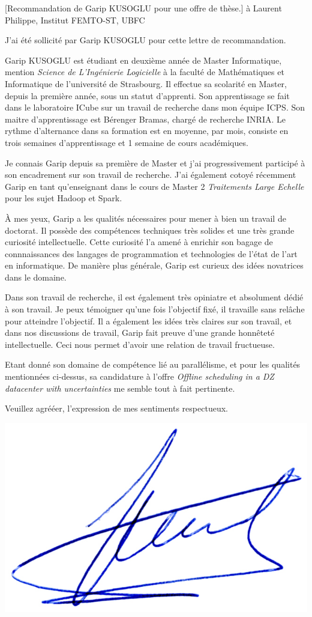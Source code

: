 \documentclass[a4paper,10pt]{article}
\begin{document}

\begin{letter}[Recommandation de Garip \textsc{KUSOGLU} pour une offre de thèse.]%
  {à}%
  {Laurent Philippe, Institut FEMTO-ST, UBFC}


\noindent  J'ai été sollicité par Garip KUSOGLU pour cette lettre de recommandation.

  Garip KUSOGLU est  étudiant en deuxième année de  Master Informatique, mention
  \textit{Science de L'Ingénierie  Logicielle} à la faculté  de Mathématiques et
  Informatique  de l'université  de  Strasbourg.  Il  effectue  sa scolarité  en
  Master, depuis la première année, sous un statut d'apprenti. Son apprentissage
  se fait dans le laboratoire ICube sur  un travail de recherche dans mon équipe
  ICPS.  Son maitre  d'apprentissage est  Bérenger Bramas,  chargé de  recherche
  INRIA. Le  rythme d'alternance  dans sa  formation est  en moyenne,  par mois,
  consiste en trois semaines d'apprentissage et 1 semaine de cours académiques.
  
  Je  connais  Garip  depuis  sa  première de  Master  et  j'ai  progressivement
  participé  à son  encadrement sur  son  travail de  recherche. J'ai  également
  cotoyé  récemment Garip  en  tant  qu'enseignant dans  le  cours  de Master  2
  \textit{Traitements Large Echelle} pour les sujet Hadoop et Spark.

À mes yeux, Garip a les qualités nécessaires pour mener à bien un travail de
doctorat. Il  possède des compétences techniques très solides et une très grande
curiosité intellectuelle. Cette curiosité l'a amené à enrichir son bagage de
connnaissances des langages  de programmation et technologies de l'état de l'art
en informatique. De manière plus générale, Garip est curieux des idées
novatrices dans le domaine.

Dans son travail de recherche, il est également très
opiniatre et absolument dédié à son travail. Je peux témoigner qu'une fois
l'objectif fixé, il travaille sans relâche pour atteindre l'objectif. Il a
également les idées très claires sur son travail, et dans nos discussions de
travail, Garip fait preuve d'une grande honnêteté intellectuelle. Ceci nous permet
d'avoir une relation de travail fructueuse.

Etant donné son domaine de compétence lié au parallélisme, et pour les qualités
mentionnées ci-dessus, sa candidature à l'offre \textit{Offline
scheduling in a DZ datacenter with uncertainties} me semble tout à fait pertinente.


  Veuillez agrééer, l'expression de mes sentiments respectueux.

\begin{flushright}
\includegraphics[width=.25\textwidth]{signgenaud.jpg} 
\end{flushright}

\end{letter}
\end{document}
